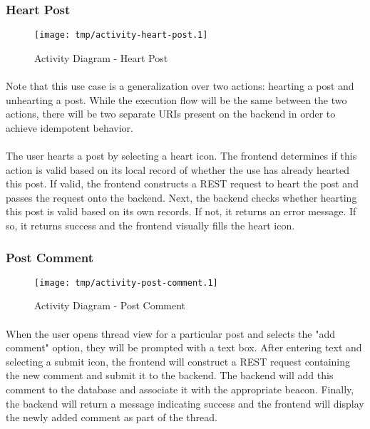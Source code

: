         \subsubsection{Heart Post}
        \begin{figure}[H]
            \centering
            \texttt{[image: tmp/activity-heart-post.1]} 
            \caption{Activity Diagram - Heart Post}
        \end{figure}

        \paragraph*{}
        Note that this use case is a generalization over two actions: hearting a post
        and unhearting a post. While the execution flow will be the same between the two
        actions, there will be two separate URIs present on the backend in order to
        achieve idempotent behavior.

        \paragraph*{}
        The user hearts a post by selecting a heart icon. The frontend determines if
        this action is valid based on its local record of whether the use has already
        hearted this post. If valid, the frontend constructs a REST request to heart
        the post and passes the request onto the backend. Next, the backend checks
        whether hearting this post is valid based on its own records. If not, it
        returns an error message. If so, it returns success and the frontend visually
        fills the heart icon.

        \subsubsection{Post Comment}
        \begin{figure}[H]
            \centering
            \texttt{[image: tmp/activity-post-comment.1]} 
            \caption{Activity Diagram - Post Comment}
        \end{figure}

        \paragraph*{}
        When the user opens thread view for a particular post and selects the "add
        comment" option, they will be prompted with a text box. After entering text
        and selecting a submit icon, the frontend will construct a REST request
        containing the new comment and submit it to the backend. The backend will add
        this comment to the database and associate it with the appropriate beacon.
        Finally, the backend will return a message indicating success and the frontend
        will display the newly added comment as part of the thread.

